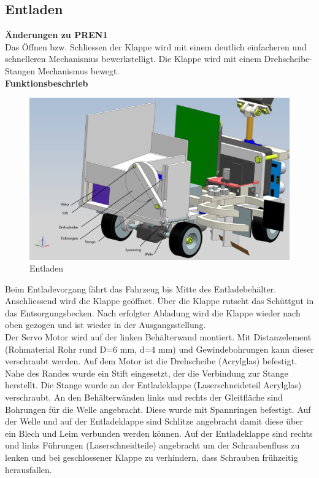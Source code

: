 \subsection{Entladen}
\textbf{Änderungen zu PREN1}\\[0.2cm]
Das Öffnen bzw. Schliessen der Klappe wird mit einem deutlich einfacheren und schnelleren Mechanismus bewerkstelligt. Die Klappe wird mit einem Drehscheibe-Stangen Mechanismus bewegt.\\[0.2cm]
\textbf{Funktionsbeschrieb}\\[0.2cm]
\begin{figure}[H]
\centering
\includegraphics[width=1\textwidth]{03_Loesungskonzept/pictures/entladen12.png}
\caption{Entladen}
\end{figure}
Beim Entladevorgang fährt das Fahrzeug bis Mitte des Entladebehälter. Anschliessend wird die Klappe geöffnet. Über die Klappe rutscht das Schüttgut in das Entsorgungsbecken. Nach erfolgter Abladung wird die Klappe wieder nach oben gezogen und ist wieder in der Ausgangsstellung.\\[0.2cm]
Der Servo Motor wird auf der linken Behälterwand montiert. Mit Distanzelement (Rohmaterial Rohr rund D=6 mm, d=4 mm) und Gewindebohrungen kann dieser verschraubt werden. Auf dem Motor ist die Drehscheibe (Acrylglas) befestigt. Nahe des Randes wurde ein Stift eingesetzt, der die Verbindung zur Stange herstellt. Die Stange wurde an der Entladeklappe (Laserschneideteil Acrylglas) verschraubt.
An den Behälterwänden links und rechts der Gleitfläche sind Bohrungen für die Welle angebracht. Diese wurde mit Spannringen befestigt. Auf der Welle und auf der Entladeklappe sind Schlitze angebracht damit diese über ein Blech und Leim verbunden werden können.
Auf der Entladeklappe sind rechts und links Führungen (Laserschneidteile) angebracht um der Schraubenfluss zu lenken und bei geschlossener Klappe zu verhindern, dass Schrauben frühzeitig herausfallen.